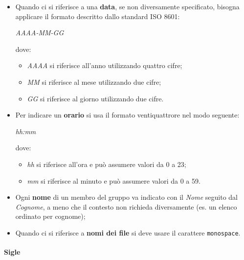 	\begin{itemize}
	
		\item Quando ci si riferisce a una \textbf{data}, se non diversamente specificato, bisogna applicare il formato descritto dallo standard ISO 8601:
		\begin{center}

			\textit{AAAA-MM-GG}
		
		\end{center}
		dove:
		\begin{itemize}

			\item \textit{AAAA} si riferisce all'anno utilizzando quattro cifre;			
			\item \textit{MM} si riferisce al mese utilizzando due cifre;
			\item \textit{GG} si riferisce al giorno utilizzando due cifre.
		
		\end{itemize}
		
		\item Per indicare un \textbf{orario} si usa il formato ventiquattrore nel modo seguente:
		
		\begin{center}

			\textit{hh:mm}		
		
		\end{center}
		dove:
		\begin{itemize}
		
			\item \textit{hh} si riferisce all'ora e può assumere valori da 0 a 23;
			\item \textit{mm} si riferisce al minuto e può assumere valori da 0 a 59.		
		
		\end{itemize}
	
		\item Ogni \textbf{nome} di un membro del gruppo va indicato con il \textit{Nome} seguito dal \textit{Cognome}, a meno che il contesto non richieda diversamente (es. un elenco ordinato per cognome);
		\item Quando ci si riferisce a \textbf{nomi dei file} si deve usare il carattere \texttt{monospace}.
		
	\end{itemize}		
	
	\paragraph{Sigle}
	
